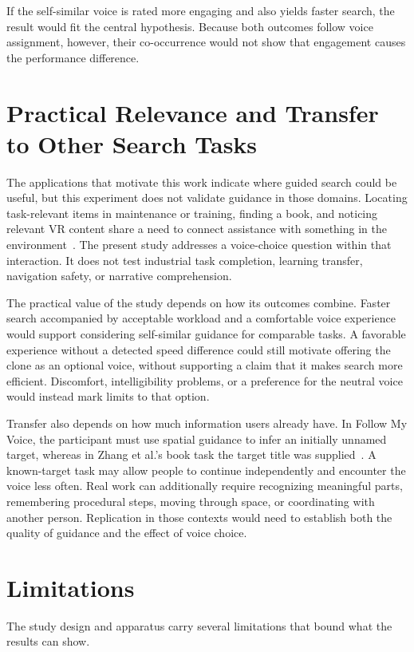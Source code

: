 If the self-similar voice is rated more engaging and also yields faster search, the result would fit the central hypothesis. Because both outcomes follow voice assignment, however, their co-occurrence would not show that engagement causes the performance difference.

\section{Practical Relevance and Transfer to Other Search Tasks}
The applications that motivate this work indicate where guided search could be useful, but this experiment does not validate guidance in those domains. Locating task-relevant items in maintenance or training, finding a book, and noticing relevant VR content share a need to connect assistance with something in the environment~\cite{binetti2021outofview,zhang2023seehear,lange2020hivefive}. The present study addresses a voice-choice question within that interaction. It does not test industrial task completion, learning transfer, navigation safety, or narrative comprehension.

The practical value of the study depends on how its outcomes combine. Faster search accompanied by acceptable workload and a comfortable voice experience would support considering self-similar guidance for comparable tasks. A favorable experience without a detected speed difference could still motivate offering the clone as an optional voice, without supporting a claim that it makes search more efficient. Discomfort, intelligibility problems, or a preference for the neutral voice would instead mark limits to that option.

Transfer also depends on how much information users already have. In Follow My Voice, the participant must use spatial guidance to infer an initially unnamed target, whereas in Zhang et al.'s book task the target title was supplied~\cite{zhang2023seehear}. A known-target task may allow people to continue independently and encounter the voice less often. Real work can additionally require recognizing meaningful parts, remembering procedural steps, moving through space, or coordinating with another person. Replication in those contexts would need to establish both the quality of guidance and the effect of voice choice.

\section{Limitations}
The study design and apparatus carry several limitations that bound what the results can show.

